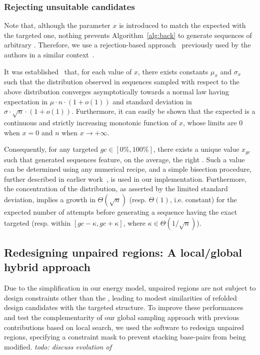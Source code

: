 \subsubsection{Rejecting unsuitable candidates}

Note that, although the parameter $x$ is introduced to match the expected \GCContent with the targeted one, nothing prevents Algorithm~\ref{alg:back} to generate sequences of arbitrary \GCContent. Therefore, we use a rejection-based approach~\cite{Bodini2010} previously used by the authors in a similar context~\cite{Waldispuhl2011}.

It was established~\cite{Waldispuhl2011} that, for each value of $x$, there exists constants $\mu_x$ and $\sigma_x$ such that the \GCContent distribution observed in sequences sampled with respect to the above distribution converges asymptotically towards a normal law having expectation in $\mu\cdot n\cdot(1+o(1))$ and standard deviation in $\sigma\cdot\sqrt{n}\cdot(1+o(1))$.
Furthermore, it can easily be shown that the expected \GCContent is a continuous and strictly increasing monotonic  function of $x$, whose limits are $0$ when $x=0$ and $n$ when $x\to +\infty$. 

Consequently, for any targeted \GCContent $gc\in[0\%,100\%]$, there exists a unique value $x_{gc}$ such that generated sequences feature, on the average, the right \GCContent. Such a value can be determined using any numerical recipe, and a simple bisection procedure, further described in earlier work~\cite{Waldispuhl2011}, is used in our implementation. Furthermore, the concentration of the distribution, as asserted by the limited standard deviation, implies a growth in $\Theta(\sqrt{n})$ (resp. $\Theta(1)$, i.e. constant) for the expected number of attempts before generating a sequence having the exact targeted \GCContent  (resp. within $[gc-\kappa,gc+\kappa]$, where $\kappa\in\Theta(1/\sqrt n)$).



\subsection{Redesigning unpaired regions: A local/global hybrid approach}
Due to the simplification in our energy model, unpaired regions are not subject to design constraints other than the \GCContent, leading to modest similarities of refolded design candidates with the targeted structure. To improve these performances and test the complementarity  of our global sampling approach with previous contributions based on local search, we used the \RNAinverse software to redesign unpaired regions, specifying a constraint mask to prevent stacking base-pairs from being modified.
{\em todo: discuss evolution of \GCContent}




